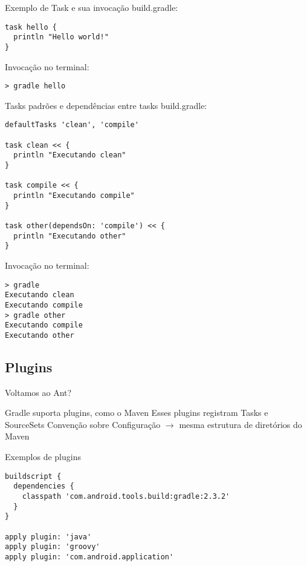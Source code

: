 \documentclass{beamer}
\begin{document}
\begin{frame}[fragile]{Exemplo de Task e sua invocação}
 build.gradle:
 \begin{verbatim}
task hello {
  println "Hello world!"
}
 \end{verbatim}
 Invocação no terminal:
 \begin{verbatim}
> gradle hello
 \end{verbatim}
\end{frame}

\begin{frame}[fragile]{Tasks padrões e dependências entre tasks}
 build.gradle:
 \begin{verbatim}
defaultTasks 'clean', 'compile'

task clean << {
  println "Executando clean"
}

task compile << {
  println "Executando compile"
}

task other(dependsOn: 'compile') << {
  println "Executando other"
}
 \end{verbatim}
 Invocação no terminal:
 \begin{verbatim}
> gradle
Executando clean
Executando compile
> gradle other
Executando compile
Executando other
 \end{verbatim}
\end{frame}

\subsection{Plugins}

\begin{frame}{Voltamos ao Ant?}
 \begin{outline}
    Gradle suporta plugins, como o Maven
    Esses plugins registram Tasks e SourceSets
    Convenção sobre Configuração $\rightarrow$ mesma estrutura de diretórios do Maven
 \end{outline}
\end{frame}

\begin{frame}[fragile]{Exemplos de plugins}
 \begin{verbatim}
buildscript {
  dependencies {
    classpath 'com.android.tools.build:gradle:2.3.2'
  }
}
 
apply plugin: 'java'
apply plugin: 'groovy'
apply plugin: 'com.android.application'
 \end{verbatim}
\end{frame}
\end{document}
